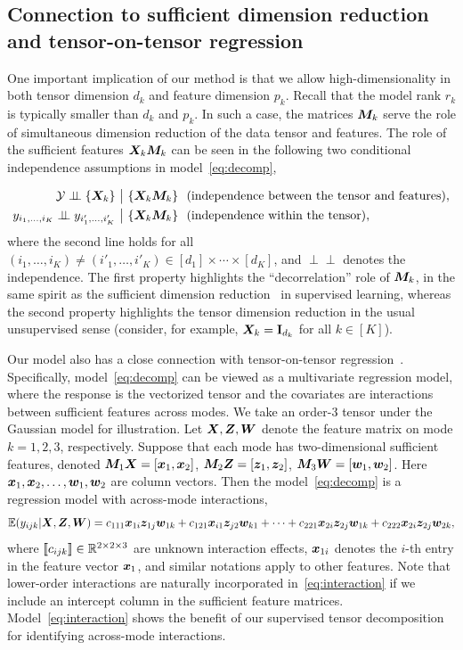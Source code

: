 \documentclass[12pt]{article}
\theoremstyle{definition}
\theoremstyle{definition}
\def\ci{\perp\!\!\!\perp}
\begin{document}
\subsection{Connection to sufficient dimension reduction and tensor-on-tensor regression}\label{sec:connection}
One important implication of our method is that we allow high-dimensionality in both tensor dimension $d_k$ and feature dimension $p_k$. Recall that the model rank $r_k$ is typically smaller than $d_k$ and $p_k$. In such a case, the matrices $\bm M_k$ serve the role of simultaneous dimension reduction of the data tensor and features. The role of the sufficient features $\bm X_k\bm M_k$ can be seen in the following two conditional independence assumptions in model~\eqref{eq:decomp},

\begin{align}
\tY \ci \{\mX_k\}&\ \big|\ \{\mX_k\mM_k\} \ \ \text{(independence between the tensor and features)},\\
y_{i_1,\ldots,i_K} \ci y_{i'_1,\ldots,i'_K} & \ \big|\ \{\mX_k\mM_k\}  \ \ \text{(independence within the tensor)},
\end{align}
where the second line holds for all $(i_1,\ldots,i_K)\neq(i'_1,\ldots,i'_K) \in[d_1]\times\cdots\times[d_K]$, and $\ci$ denotes the independence. The first property highlights the ``decorrelation'' role of $\bm M_k$, in the same spirit as the sufficient dimension reduction~\citep{adragni2009sufficient} in supervised learning, whereas the second property highlights the tensor dimension reduction in the usual unsupervised sense (consider, for example, $\bm X_k=\mathbf{I}_{d_k}$ for all $k\in[K]$).

Our model also has a close connection with tensor-on-tensor regression~\citep{raskutti2019convex, lock2018tensor,gahrooei2020multiple}. Specifically, model~\eqref{eq:decomp} can be viewed as a multivariate regression model, where the response is the vectorized tensor and the covariates are interactions between sufficient features across modes. We take an order-3 tensor under the Gaussian model for illustration. Let $\bm X,\bm Z,\bm{W}$ denote the feature matrix on mode $k=1, 2, 3$, respectively. Suppose that each mode has two-dimensional sufficient features, denoted $\bm M_1\bm X=[\bm x_1,\bm x_2]$, $\bm M_2\bm Z=[\bm{z}_1,\bm{z}_2]$, $\bm M_3\bm{W}=[\bm{w}_1,\bm{w}_2]$. Here $\bm x_1,\bm x_2,\ldots,\bm{w}_1, \bm{w}_2$ are column vectors. Then the model~\eqref{eq:decomp} is a regression model with across-mode interactions,
\begin{equation}\label{eq:interaction}
\mathbb{E}(y_{ijk}|\bm X,\bm Z,\bm{W})=c_{111}\bm x_{1i}\bm{z}_{1j}\bm{w}_{1k}+c_{121}\bm x_{i1}\bm{z}_{j2}\bm{w}_{k1}+\cdots+c_{221}\bm x_{2i}\bm{z}_{2j}\bm{w}_{1k}+c_{222}\bm x_{2i}\bm{z}_{2j}\bm{w}_{2k},
\end{equation}
where $\llbracket c_{ijk} \rrbracket \in \mathbb{R}^{2\times 2\times 3}$ are unknown interaction effects, $\bm x_{1i}$ denotes the $i$-th entry in the feature vector $\bm x_1$, and similar notations apply to other features. Note that lower-order interactions are naturally incorporated in~\eqref{eq:interaction} if we include an intercept column in the sufficient feature matrices. Model~\eqref{eq:interaction} shows the benefit of our supervised tensor decomposition for identifying across-mode interactions. 
\end{document}
